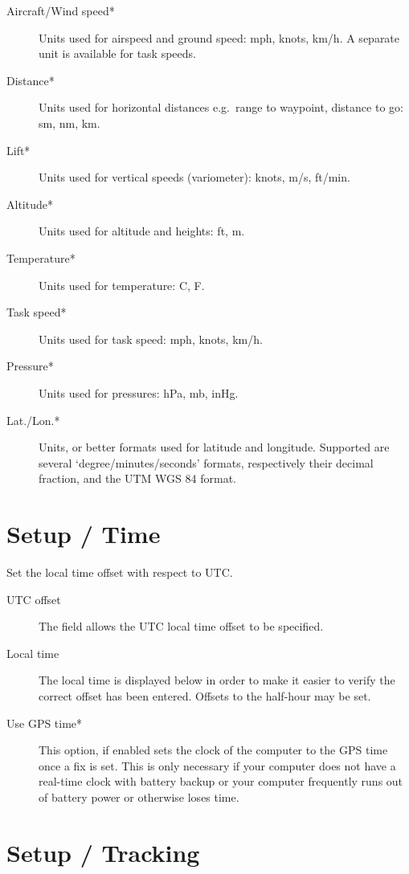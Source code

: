 \begin{description}
\item[Aircraft/Wind speed*]  Units used for airspeed and ground speed: mph, 
  knots, km/h. A separate unit is available for task speeds.
\item[Distance*]  Units used for horizontal distances e.g.\ range to waypoint,
  distance to go: sm, nm, km.
\item[Lift*]  Units used for vertical speeds (variometer): knots, m/s, ft/min.
\item[Altitude*] Units used for altitude and heights: ft, m.
\item[Temperature*]  Units used for temperature: \degree C, \degree F.
\item[Task speed*] Units used for task speed: mph, knots, km/h.
\item[Pressure*]  Units used for pressures: hPa, mb, inHg.
\item[Lat./Lon.*]  Units, or better formats used for latitude and longitude. 
  Supported are several `degree/minutes/seconds' formats, respectively 
  their decimal fraction, and the  UTM WGS 84 format.
\end{description}


\section{Setup / Time}

Set the local time offset with respect to UTC.

\begin{description}
\item[UTC offset]  The field allows the UTC local time offset to be specified.
\item[Local time]  The local time is displayed below in order to make it easier to verify
  the correct offset has been entered.  Offsets to the half-hour may be set.
\item[Use GPS time*] This option, if enabled sets the clock of the computer to 
  the GPS time once a fix is set. This is only necessary if your computer does 
  not have a real-time clock with battery backup or your computer 
  frequently runs out of battery power or otherwise loses time.
\end{description}


\section{Setup / Tracking}

